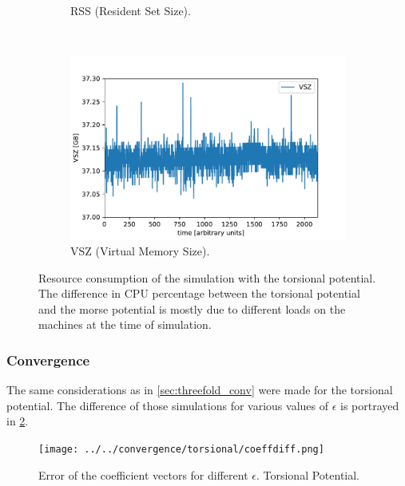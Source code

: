 \documentclass[11pt, a4paper, oneside]{article}
\begin{document}
\begin{figure}[H]
\begin{subfigure}[b]{0.45 \textwidth}
    \caption{RSS (Resident Set Size).}
  \end{subfigure}
  ~
  \begin{subfigure}[b]{0.45 \textwidth}
    \includegraphics[width = \textwidth]{../parser/cospot_VSZ.pdf}
    \caption{VSZ (Virtual Memory Size).}
  \end{subfigure}
  \caption{Resource consumption of the simulation with the torsional potential. The difference in CPU percentage between the torsional potential and the morse potential is mostly due to different loads on the machines at the time of simulation.}
  \label{fig:cos_resource}
\end{figure}


\subsubsection{Convergence}
The same considerations as in \cref{sec:threefold_conv} were made for the torsional potential. The difference of those simulations for various values of $\epsilon$ is portrayed in \cref{fig:convtorsional}.
\begin{figure}[H]
  \centering
  \texttt{[image: ../../convergence/torsional/coeffdiff.png]}
  \caption{Error of the coefficient vectors for different $\epsilon$. Torsional Potential.}
  \label{fig:convtorsional}
\end{figure}
\end{document}
